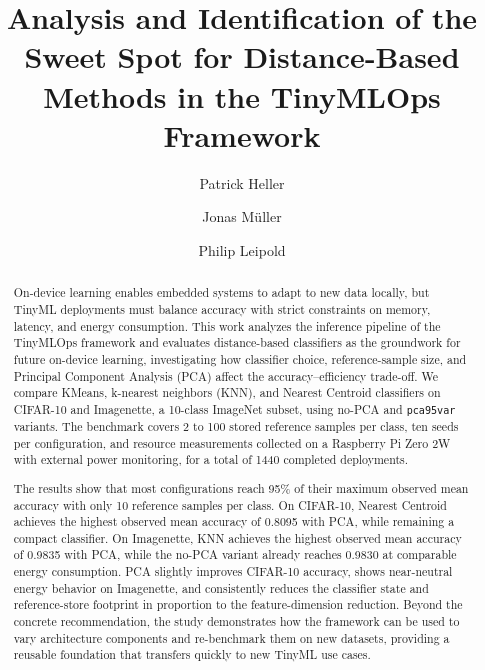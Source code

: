 \documentclass[sigconf,review]{acmart}
\begin{document}
\title{Analysis and Identification of the Sweet Spot for Distance-Based Methods in the TinyMLOps Framework}

\author{Patrick Heller}
\author{Jonas M{\"u}ller}
\author{Philip Leipold}

\renewcommand{\shortauthors}{Heller et al.}

\begin{abstract}
On-device learning enables embedded systems to adapt to new data locally, but TinyML deployments must balance accuracy with strict constraints on memory, latency, and energy consumption.
This work analyzes the inference pipeline of the TinyMLOps framework and evaluates distance-based classifiers as the groundwork for future on-device learning, investigating how classifier choice, reference-sample size, and Principal Component Analysis (PCA) affect the accuracy--efficiency trade-off.
We compare KMeans, k-nearest neighbors (KNN), and Nearest Centroid classifiers on CIFAR-10 and Imagenette, a 10-class ImageNet subset, using no-PCA and \texttt{pca95var} variants.
The benchmark covers 2 to 100 stored reference samples per class, ten seeds per configuration, and resource measurements collected on a Raspberry Pi Zero 2W with external power monitoring, for a total of 1440 completed deployments.

The results show that most configurations reach 95\% of their maximum observed mean accuracy with only 10 reference samples per class.
On CIFAR-10, Nearest Centroid achieves the highest observed mean accuracy of 0.8095 with PCA, while remaining a compact classifier.
On Imagenette, KNN achieves the highest observed mean accuracy of 0.9835 with PCA, while the no-PCA variant already reaches 0.9830 at comparable energy consumption.
PCA slightly improves CIFAR-10 accuracy, shows near-neutral energy behavior on Imagenette, and consistently reduces the classifier state and reference-store footprint in proportion to the feature-dimension reduction.
Beyond the concrete recommendation, the study demonstrates how the framework can be used to vary architecture components and re-benchmark them on new datasets, providing a reusable foundation that transfers quickly to new TinyML use cases.
\end{abstract}
\end{document}
